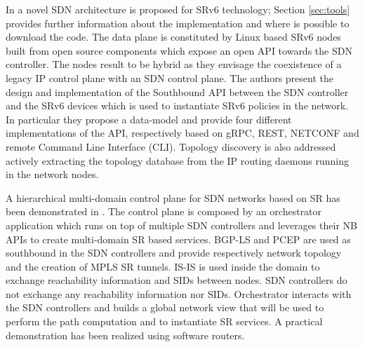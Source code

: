 In \cite{ventre2018sdn} a novel SDN architecture is proposed for SRv6 technology; Section \ref{sec:tools} provides further information about the implementation and where is possible to download the code. The data plane is constituted by Linux based SRv6 nodes built from open source components which expose an open API towards the SDN controller. The nodes result to be hybrid as they envisage the coexistence of a legacy IP control plane with an SDN control plane. The authors present the design and implementation of the Southbound API between the SDN controller and the SRv6 devices which is used to instantiate SRv6 policies in the network. In particular they propose a data-model and provide four different implementations of the API, respectively based on gRPC, REST, NETCONF and remote Command Line Interface (CLI). Topology discovery is also addressed actively extracting the topology database from the IP routing daemons running in the network nodes. %

A hierarchical multi-domain control plane for SDN networks based on SR has been demonstrated in \cite{demonstrationofsr}. The control plane is composed by an orchestrator application which runs on top of multiple SDN controllers and leverages their NB APIs to create multi-domain SR based services. BGP-LS and PCEP are used as southbound in the SDN controllers and provide respectively network topology and the creation of MPLS SR tunnels. IS-IS is used inside the domain to exchange reachability information and SIDs between nodes. SDN controllers do not exchange any reachability information nor SIDs. Orchestrator interacts with the SDN controllers and builds a global network view that will be used to perform the path computation and to instantiate SR services. A practical demonstration has been realized using software routers. 

